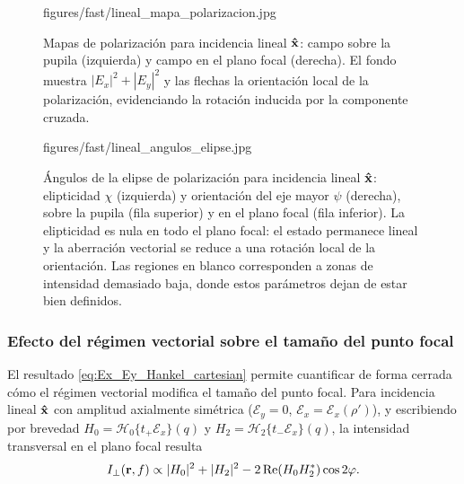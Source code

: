 \begin{figure}[H]
  \centering
    {figures/fast/lineal_mapa_polarizacion.jpg}
  \caption{Mapas de polarización para incidencia lineal $\bm{\hat{\mathbf{x}}}$: campo sobre la pupila (izquierda) y campo en el plano focal (derecha). El fondo muestra $|E_x|^2+|E_y|^2$ y las flechas la orientación local de la polarización, evidenciando la rotación inducida por la componente cruzada.}
  \label{fig:lineal-plano-focal-mapa-polarizacion}
\end{figure}

\begin{figure}[H]
  \centering
    {figures/fast/lineal_angulos_elipse.jpg}
  \caption{Ángulos de la elipse de polarización para incidencia lineal $\bm{\hat{\mathbf{x}}}$: elipticidad $\chi$ (izquierda) y orientación del eje mayor $\psi$ (derecha), sobre la pupila (fila superior) y en el plano focal (fila inferior). La elipticidad es nula en todo el plano focal: el estado permanece lineal y la aberración vectorial se reduce a una rotación local de la orientación. Las regiones en blanco corresponden a zonas de intensidad demasiado baja, donde estos parámetros dejan de estar bien definidos.}
  \label{fig:lineal-plano-focal-mapas-escalares}
\end{figure}

\subsubsection{Efecto del régimen vectorial sobre el tamaño del punto focal}
\label{subsubsec:spot_vectorial}

El resultado \eqref{eq:Ex_Ey_Hankel_cartesian} permite cuantificar de forma
cerrada cómo el régimen vectorial modifica el tamaño del punto focal. Para
incidencia lineal $\bm{\hat{\mathbf{x}}}$ con amplitud axialmente simétrica
($\mathscr E_y=0$, $\mathscr E_x=\mathscr E_x(\rho')$), y escribiendo por
brevedad $H_0=\mathscr H_0\{t_+\mathscr E_x\}(q)$ y
$H_2=\mathscr H_2\{t_-\mathscr E_x\}(q)$, la intensidad transversal en el
plano focal resulta
\begin{equation}
  I_\perp(\vb r, f)
  \propto
  |H_0|^2
  +
  |H_2|^2
  -
  2\operatorname{Re}(H_0 H_2^*)\cos 2\varphi.
\label{eq:I_spot_linear_deformation}
\end{equation}

